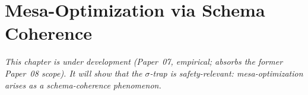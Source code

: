\chapter{Mesa-Optimization via Schema Coherence}
\label{ch:mesa-optimization}

\textit{This chapter is under development (Paper~07, empirical; absorbs the former
Paper~08 scope). It will show that the $\sigma$-trap is safety-relevant: mesa-optimization
arises as a schema-coherence phenomenon.}
